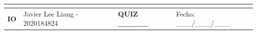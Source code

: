 \documentclass[conference, onecolumn, 12pt]{IEEEtran}
\begin{document}
\renewcommand{\arraystretch}{2.5}
\begin{table}[H]
\begin{tabularx}{\textwidth}{|XXXX|}
\hline
\multicolumn{4}{|l|}{\cellcolor{orange}}                                                                                                                      \\ \hline
\multicolumn{1}{|p{0.06\textwidth}|}{\textbf{\large{IO}}} & \multicolumn{1}{p{0.475\textwidth}|}{\large{Javier Lee Liang - 2020184824}} & \multicolumn{1}{p{0.15\textwidth}|}{\textbf{\large{QUIZ \_\_\_\_\_}}} & \multicolumn{1}{p{0.22\textwidth}|}{\large{Fecha: \_\_\_/\_\_\_/\_\_\_}} \\ \hline
\end{tabularx}
\end{table}
\end{document}
